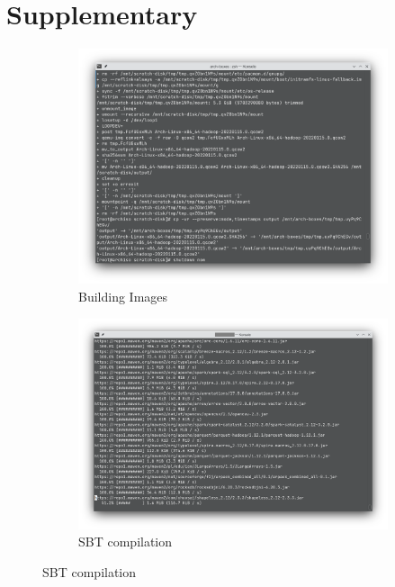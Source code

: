 \clearpage
\onecolumn
\section*{Supplementary}
\begin{figure}[ht]
     \centering
     
     \begin{subfigure}[b]{0.48\textwidth}
         \centering
        \includegraphics[width=\textwidth]{figure/build-images.png}
        \caption{Building Images}
        \label{fig:build-img}
     \end{subfigure}
     \begin{subfigure}[b]{0.48\textwidth}
         \centering
    \includegraphics[width=\textwidth]{figure/compiling.png}
    \caption{SBT compilation}
    \label{fig:compile}
     \end{subfigure}
     

\end{figure}
